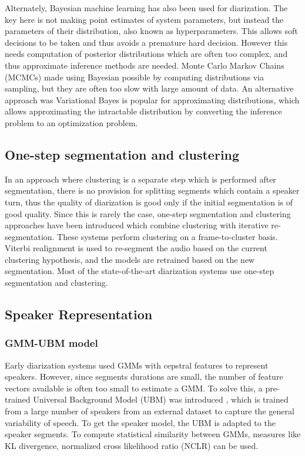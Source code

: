 	Alternately, Bayesian machine learning has also been used for diarization. The key here is not making point estimates of system parameters, but instead the parameters of their distribution, also known as hyperparameters. This allows soft decisions to be taken and thus avoids a premature hard decision. However this needs computation of posterior distributions which are often too complex, and thus approximate inference methods are needed. Monte Carlo Markov Chains (MCMCs) made using Bayesian possible by computing distributions via sampling, but they are often too slow with large amount of data. An  alternative approach was Variational Bayes \cite{10.1007/11677482_27} \cite{Reynolds2009ASO} \cite{Kenny2008BayesianAO} is popular for approximating distributions, which allows approximating the intractable distribution by converting the inference problem to an optimization problem.
	
	\subsection{One-step segmentation and clustering}
	In an approach where clustering is a separate step which is performed after segmentation, there is no provision for splitting segments which contain a speaker turn, thus the quality of diarization is good only if the initial segmentation is of good quality. Since this is rarely the case, one-step segmentation and clustering approaches have been introduced which combine clustering with iterative re-segmentation. These systems perform clustering on a frame-to-cluster basis. Viterbi realignment is used to re-segment the audio based on the current clustering hypothesis, and the models are retrained based on the new segmentation. Most of the state-of-the-art diarization systems use one-step segmentation and clustering.
	
	\subsection{Speaker Representation}
		\subsubsection{GMM-UBM model}
		Early diarization systems used GMMs with cepstral features to represent speakers. However, since segments durations are small, the number of feature vectors available is often too small to estimate a GMM. To solve this, a pre-trained Universal Background Model (UBM) was introduced \cite{Reynolds:2000:SVU:2774258.2774423}, which is trained from a large number of speakers from an external dataset to capture the general variability of speech. To get the speaker model, the UBM is adapted to the speaker segments. To compute statistical similarity between GMMs, measures like KL divergence, normalized cross likelihood ratio (NCLR) can be used.
				
